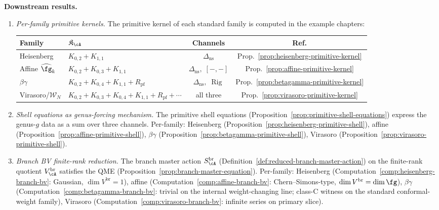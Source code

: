 \smallskip\noindent
\textbf{Downstream results.}
\begin{enumerate}[label=\textup{(\alph*)}]
\item \emph{Per-family primitive kernels.}
 The primitive kernel of each standard family is computed in the
 example chapters:
 \begin{center}
 \renewcommand{\arraystretch}{1.2}
 \begin{tabular}{llcc}
 \textbf{Family} & $\mathfrak K_\cA$ &
 \textbf{Channels} & \textbf{Ref.} \\
 \hline
 Heisenberg & $K_{0,2} + K_{1,1}$ &
 $\Delta_{\mathrm{ns}}$ &
 Prop.~\ref{prop:heisenberg-primitive-kernel} \\
 Affine $\widehat\fg_k$ & $K_{0,2} + K_{0,3} + K_{1,1}$ &
 $\Delta_{\mathrm{ns}},\; [-,-]$ &
 Prop.~\ref{prop:affine-primitive-kernel} \\
 $\beta\gamma$ & $K_{0,2} + K_{0,4} + K_{1,1} + R_{\mathrm{pf}}$ &
 $\Delta_{\mathrm{ns}},\; \operatorname{Rig}$ &
 Prop.~\ref{prop:betagamma-primitive-kernel} \\
 Virasoro/$\mathcal{W}_N$ & $K_{0,2} + K_{0,3} + K_{0,4} + K_{1,1} + R_{\mathrm{pf}} + \cdots$ &
 all three &
 Prop.~\ref{prop:virasoro-primitive-kernel}
 \end{tabular}
 \end{center}

\item \emph{Shell equations as genus-forcing mechanism.}
 The primitive shell equations
 (Proposition~\ref{prop:primitive-shell-equations}) express
 the genus-$g$ data as a sum over three channels.
 Per-family:
 Heisenberg (Proposition~\ref{prop:heisenberg-primitive-shell}),
 affine (Proposition~\ref{prop:affine-primitive-shell}),
 $\beta\gamma$ (Proposition~\ref{prop:betagamma-primitive-shell}),
 Virasoro (Proposition~\ref{prop:virasoro-primitive-shell}).

\item \emph{Branch BV finite-rank reduction.}
 The branch master action $S_\cA^{\mathrm{br}}$
 (Definition~\ref{def:reduced-branch-master-action}) on the
 finite-rank quotient $V_\cA^{\mathrm{br}}$ satisfies the QME
 (Proposition~\ref{prop:branch-master-equation}).
 Per-family:
 Heisenberg (Computation~\ref{comp:heisenberg-branch-bv}:
 Gaussian, $\dim V^{\mathrm{br}} = 1$),
 affine (Computation~\ref{comp:affine-branch-bv}:
 Chern--Simons-type, $\dim V^{\mathrm{br}} = \dim\fg$),
 $\beta\gamma$ (Computation~\ref{comp:betagamma-branch-bv}:
 trivial on the internal weight-changing line; class-C witness on the
 standard conformal-weight family),
 Virasoro (Computation~\ref{comp:virasoro-branch-bv}: infinite
 series on primary slice).


\end{enumerate}
